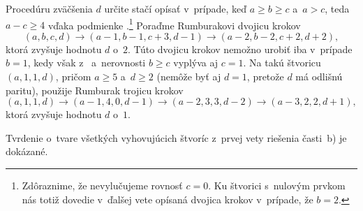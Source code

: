 {Procedúru zväčšenia $d$ určite stačí opísať v~prípade,
keď $a\ge b\ge c$ a~$a>c$, teda $a-c\ge4$ vďaka
podmienke .\footnote{Zdôraznime, že
nevylučujeme rovnosť $c=0$. Ku štvorici s~nulovým prvkom
nás totiž dovedie v~ďalšej vete
opísaná dvojica krokov v~prípade, že $b=2$.}
Poraďme Rumburakovi dvojicu krokov
$$
(a,b,c,d)\to(a-1,b-1,c+3,d-1)\to(a-2,b-2,c+2,d+2),
$$
ktorá zvyšuje hodnotu $d$ o~$2$. Túto dvojicu krokov nemožno
urobiť iba v~prípade $b=1$, kedy však z~ a~nerovnosti
$b\ge c$ vyplýva aj $c=1$. Na takú štvoricu $(a,1,1,d)$,
pričom $a\ge5$ a~$d\ge2$ (nemôže byť aj $d=1$, pretože $d$ má
odlišnú paritu), použije Rumburak trojicu krokov
$$
(a,1,1,d)\to(a-1,4,0,d-1)\to(a-2,3,3,d-2)\to(a-3,2,2,d+1),
$$
ktorá zvyšuje hodnotu $d$ o~$1$.

Tvrdenie o~tvare všetkých vyhovujúcich štvoríc z~prvej vety riešenia časti~b) je dokázané.
}

